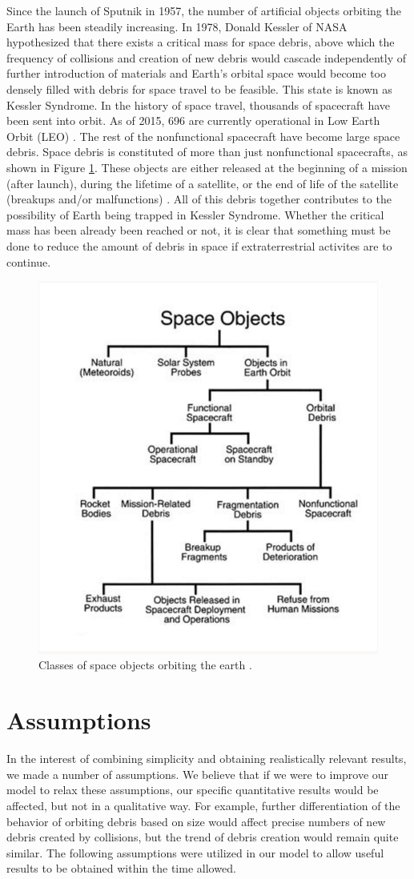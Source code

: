 \documentclass[pre,12pt]{revtex4-1}
\begin{document}
Since the launch of Sputnik in 1957, the number of artificial objects orbiting the Earth has been steadily increasing. In 1978, Donald Kessler of NASA hypothesized that there exists a critical mass for space debris, above which the frequency of collisions and creation of new debris would cascade independently of further introduction of materials and Earth's orbital space would become too densely filled with debris for space travel to be feasible. This state is known as Kessler Syndrome.\cite{kesslerSyndrome} In the history of space travel, thousands of spacecraft have been sent into orbit. As of 2015, 696 are currently operational in Low Earth Orbit (LEO) \cite{satelliteDB}. The rest of the nonfunctional spacecraft have become large space debris. Space debris is constituted of more than just nonfunctional spacecrafts, as shown in Figure \ref{fig:classesOfSpaceObjects}. These objects are either released at the beginning of a mission (after launch), during the lifetime of a satellite, or the end of life of the satellite (breakups and/or malfunctions) \cite{orbitalDebris, studyOfOrbitalDebris}. All of this debris together contributes to the possibility of Earth being trapped in Kessler Syndrome. Whether the critical mass has been already been reached or not, it is clear that something must be done to reduce the amount of debris in space if extraterrestrial activites are to continue.

\begin{figure}[h!]
	\centering
    \includegraphics[width=0.35\linewidth]{figures/classesOfSpaceObjects.png}
    \caption{Classes of space objects orbiting the earth \cite{orbitalDebris}.}
    \label{fig:classesOfSpaceObjects}
\end{figure}

\section{Assumptions}\label{Assumptions}

In the interest of combining simplicity and obtaining realistically relevant results, we made a number of assumptions. We believe that if we were to improve our model to relax these assumptions, our specific quantitative results would be affected, but not in a qualitative way. For example, further differentiation of the behavior of orbiting debris based on size would affect precise numbers of new debris created by collisions, but the trend of debris creation would remain quite similar. The following assumptions were utilized in our model to allow useful results to be obtained within the time allowed.
\end{document}
